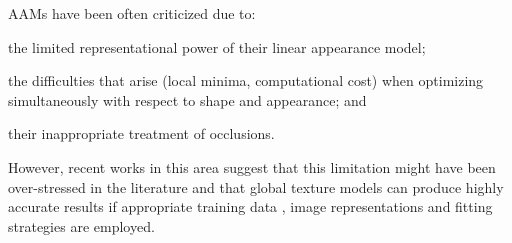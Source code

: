 AAMs have been often criticized due to: 
\begin{inparaenum} 
\item the limited representational power of their linear appearance model; 
\item the difficulties that arise (local minima, computational cost) when optimizing simultaneously with respect to shape and appearance; and
\item their inappropriate treatment of occlusions. 
\end{inparaenum}
However, recent works in this area \cite{Tzimiropoulos2012, Lucey2013, Tzimiropoulos2014, Antonakos2014} suggest that this limitation might have been over-stressed in the literature and that global texture models can produce highly accurate results if appropriate training data \cite{Tzimiropoulos2013}, image representations \cite{Tzimiropoulos2012, Lucey2013, Tzimiropoulos2014, Antonakos2014} and fitting strategies \cite{Tzimiropoulos2012, Tzimiropoulos2013} are employed.

